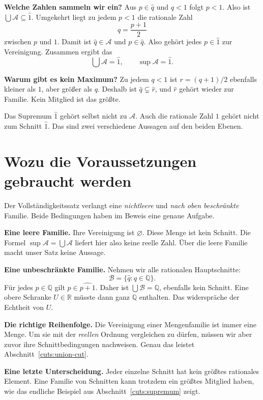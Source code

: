 \textbf{Welche Zahlen sammeln wir ein?}
Aus $p\in\widehat q$ und $q<1$ folgt $p<1$.
Also ist $\bigcup\mathcal A\subseteq\widehat1$.
Umgekehrt liegt zu jedem $p<1$ die rationale Zahl
\[
 q=\frac{p+1}{2}
\]
zwischen $p$ und $1$. Damit ist $\widehat q\in\mathcal A$ und
$p\in\widehat q$. Also gehört jedes $p\in\widehat1$ zur Vereinigung.
Zusammen ergibt das
\[
 \bigcup\mathcal A=\widehat1,
 \qquad \sup\mathcal A=\widehat1.
\]

\textbf{Warum gibt es kein Maximum?}
Zu jedem $q<1$ ist $r=(q+1)/2$ ebenfalls kleiner als $1$, aber größer als $q$.
Deshalb ist $\widehat q\subsetneq\widehat r$, und $\widehat r$ gehört
wieder zur Familie. Kein Mitglied ist das größte.

Das Supremum $\widehat1$ gehört selbst nicht zu $\mathcal A$.
Auch die rationale Zahl $1$ gehört nicht zum Schnitt $\widehat1$.
Das sind zwei verschiedene Aussagen auf den beiden Ebenen.

\clearpage
\section{Wozu die Voraussetzungen gebraucht werden}
\label{cuts:limits}

Der Vollständigkeitssatz verlangt eine \emph{nichtleere} und
\emph{nach oben beschränkte} Familie. Beide Bedingungen haben im Beweis
eine genaue Aufgabe.

\textbf{Eine leere Familie.}
Ihre Vereinigung ist $\varnothing$. Diese Menge ist kein Schnitt.
Die Formel $\sup\mathcal A=\bigcup\mathcal A$ liefert hier also
keine reelle Zahl. Über die leere Familie macht unser Satz keine Aussage.

\textbf{Eine unbeschränkte Familie.}
Nehmen wir alle rationalen Hauptschnitte:
\[
 \mathcal B=\{\widehat q:q\in\mathbb Q\}.
\]
Für jedes $p\in\mathbb Q$ gilt $p\in\widehat{p+1}$.
Daher ist $\bigcup\mathcal B=\mathbb Q$, ebenfalls kein Schnitt.
Eine obere Schranke $U\in\mathbb R$ müsste dann ganz $\mathbb Q$
enthalten. Das widerspräche der Echtheit von $U$.

\textbf{Die richtige Reihenfolge.}
Die Vereinigung einer Mengenfamilie ist immer eine Menge.
Um sie mit der \emph{reellen} Ordnung vergleichen zu dürfen,
müssen wir aber zuvor ihre Schnittbedingungen nachweisen.
Genau das leistet Abschnitt~\ref{cuts:union-cut}.

\textbf{Eine letzte Unterscheidung.}
Jeder einzelne Schnitt hat kein größtes rationales Element.
Eine Familie von Schnitten kann trotzdem ein größtes Mitglied haben,
wie das endliche Beispiel aus Abschnitt~\ref{cuts:supremum} zeigt.
